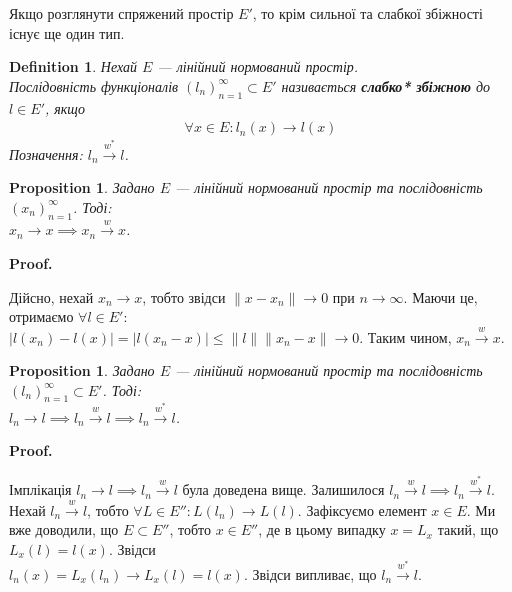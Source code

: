 \documentclass[a4paper, 10pt]{article}
\makeatletter
\theoremstyle{theoremdd}
\theoremstyle{theoremdd}
\newtheorem{definition}[theorem]{Definition}
\theoremstyle{theoremdd}
\theoremstyle{theoremdd}
\theoremstyle{theoremdd}
\newtheorem{proposition}[theorem]{Proposition}
\theoremstyle{theoremdd}
\theoremstyle{theoremdd}
\theoremstyle{theoremdd}
\newcommand{\toweak}{\overset{w}{\to}}
\newcommand{\toweakstar}{\overset{w^*}{\to}}
\renewenvironment{proof}[1][Proof.\\]{\par
\pushQED{\hfill \qed}%
\normalfont \topsep6\p@\@plus6\p@\relax
\trivlist
\item\relax
{\bfseries
#1\@addpunct{.}}\hspace\labelsep\ignorespaces
}{%
\popQED\endtrivlist\@endpefalse
}
\makeatother
\begin{document}
Якщо розглянути спряжений простір $E'$, то крім сильної та слабкої збіжності існує ще один тип.

\begin{definition}
Нехай $E$ --- лінійний нормований простір.\\
Послідовність функціоналів $(l_n)_{n=1}^\infty \subset E'$ називається \textbf{слабко* збіжною} до $l \in E'$, якщо
\begin{align*}
\forall x \in E: l_n(x) \to l(x)
\end{align*}
Позначення: $l_n \toweakstar l$.
\end{definition}

\begin{proposition}
Задано $E$ --- лінійний нормований простір та послідовність $(x_n)_{n=1}^\infty$. Тоді:\\
$x_n \to x \implies x_n \toweak x$.
\end{proposition}

\begin{proof}
Дійсно, нехай $x_n \to x$, тобто звідси $\|x-x_n\| \to 0$ при $n \to \infty$. Маючи це, отримаємо $\forall l \in E'$:\\
$|l(x_n)-l(x)| = |l(x_n-x)| \leq \|l\| \|x_n - x\| \to 0$. Таким чином, $x_n \toweak x$.
\end{proof}

\begin{proposition}
Задано $E$ --- лінійний нормований простір та послідовність $(l_n)_{n=1}^\infty \subset E'$. Тоді:\\
$l_n \to l \implies l_n \toweak l \implies l_n \toweakstar l$.
\end{proposition}

\begin{proof}
Імплікація $l_n \to l \implies l_n \toweak l$ була доведена вище. Залишилося $l_n \toweak l \implies l_n \toweakstar l$.\\
Нехай $l_n \toweak l$, тобто $\forall L \in E'': L(l_n) \to L(l)$. Зафіксуємо елемент $x \in E$. Ми вже доводили, що $E \subset E''$, тобто $x \in E''$, де в цьому випадку $x = L_x$ такий, що $L_x(l) = l(x)$. Звідси\\
$l_n(x) = L_x(l_n) \to L_x(l) = l(x)$. Звідси випливає, що $l_n \toweakstar l$.
\end{proof}
\end{document}
